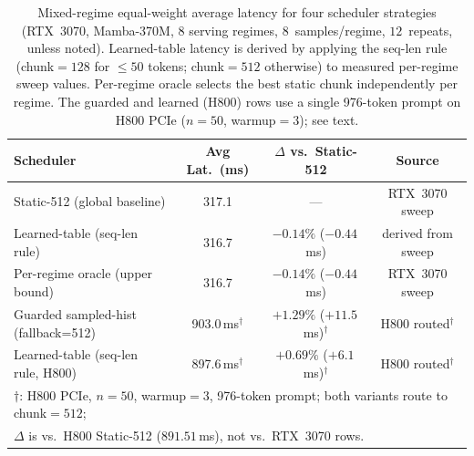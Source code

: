 \begin{table}[!t]
\centering
\caption{Mixed-regime equal-weight average latency for four scheduler strategies (RTX~3070, Mamba-370M, $8$ serving regimes, $8$~samples/regime, $12$~repeats, unless noted). Learned-table latency is derived by applying the seq-len rule (chunk$=128$ for $\leq50$ tokens; chunk$=512$ otherwise) to measured per-regime sweep values. Per-regime oracle selects the best static chunk independently per regime. The guarded and learned (H800) rows use a single 976-token prompt on H800 PCIe ($n{=}50$, warmup$=3$); see text.}
\label{tab:scheduler_oracle_comparison}
\small
\begin{tabular}{lccc}
\toprule
Scheduler & Avg Lat.\ (ms) & $\Delta$ vs.\ Static-512 & Source \\
\midrule
Static-512 (global baseline)       & 317.1 & ---              & RTX~3070 sweep \\
Learned-table (seq-len rule)        & 316.7 & $-0.14\%$ ($-0.44$\,ms) & derived from sweep \\
Per-regime oracle (upper bound)     & 316.7 & $-0.14\%$ ($-0.44$\,ms) & RTX~3070 sweep \\
Guarded sampled-hist (fallback=512) & 903.0\,ms$^\dagger$ & $+1.29\%$ ($+11.5$\,ms)$^\dagger$ & H800 routed$^\dagger$ \\
Learned-table (seq-len rule, H800)  & 897.6\,ms$^\dagger$ & $+0.69\%$ ($+6.1$\,ms)$^\dagger$  & H800 routed$^\dagger$ \\
\bottomrule
\multicolumn{4}{l}{\small $\dagger$: H800 PCIe, $n{=}50$, warmup$=3$, 976-token prompt; both variants route to chunk$=512$;} \\
\multicolumn{4}{l}{\small \hspace{1.4em} $\Delta$ is vs.\ H800 Static-512 ($891.51$\,ms), not vs.\ RTX~3070 rows.} \\
\end{tabular}
\end{table}
